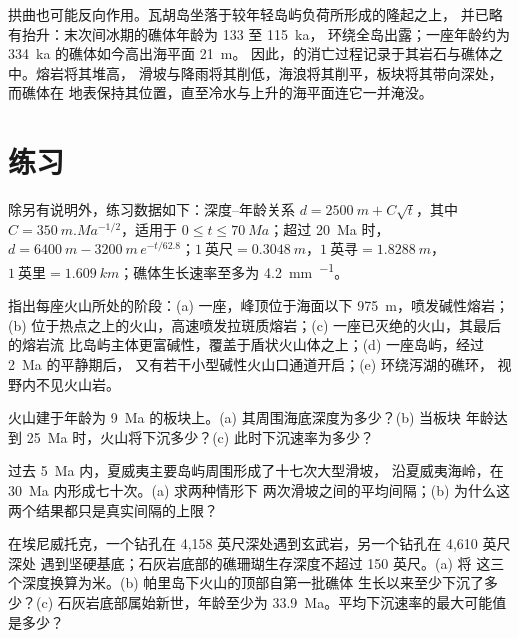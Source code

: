 拱曲也可能反向作用。瓦胡岛坐落于较年轻岛屿负荷所形成的隆起之上，
并已略有抬升：末次间冰期的礁体年龄为 133 至 \qty{115}{ka}，
环绕全岛出露；一座年龄约为 \qty{334}{ka} 的礁体如今高出海平面 \qty{21}{m}。
因此，的消亡过程记录于其岩石与礁体之中。熔岩将其堆高，
滑坡与降雨将其削低，海浪将其削平，板块将其带向深处，而礁体在
地表保持其位置，直至冷水与上升的海平面连它一并淹没。

\section*{练习}\label{sec:b2:oceanic-islands:exercises}

除另有说明外，练习数据如下：深度–年龄关系 $d = \qty{2500}{m} + C\sqrt t$，其中
$C = \qty{350}{m.Ma^{-1/2}}$，适用于 $0 \le t \le \qty{70}{Ma}$；超过 \qty{20}{Ma} 时，$d = \qty{6400}{m} -
\qty{3200}{m}\,e^{-t/62.8}$；$1~\text{英尺} = \qty{0.3048}{m}$，$1~\text{英寻}
= \qty{1.8288}{m}$，$1~\text{英里} = \qty{1.609}{km}$；礁体生长速率至多为 \qty{4.2}{mm.^{-1}}。

\begin{exercise}[$\star$]\label{exo:b2:oceanic-islands:1}
指出每座火山所处的阶段：(a) 一座，峰顶位于海面以下 \qty{975}{m}，喷发碱性熔岩；
(b) 位于热点之上的火山，高速喷发拉斑质熔岩；(c) 一座已灭绝的火山，其最后的熔岩流
比岛屿主体更富碱性，覆盖于盾状火山体之上；(d) 一座岛屿，经过 \qty{2}{Ma} 的平静期后，
又有若干小型碱性火山口通道开启；(e) 环绕泻湖的礁环，
视野内不见火山岩。
\end{exercise}

\begin{exercise}[$\star$]\label{exo:b2:oceanic-islands:2}
火山建于年龄为 \qty{9}{Ma} 的板块上。(a) 其周围海底深度为多少？(b) 当板块
年龄达到 \qty{25}{Ma} 时，火山将下沉多少？(c) 此时下沉速率为多少？
\end{exercise}

\begin{exercise}[$\star$]\label{exo:b2:oceanic-islands:3}
过去 \qty{5}{Ma} 内，夏威夷主要岛屿周围形成了十七次大型滑坡，
沿夏威夷海岭，在 \qty{30}{Ma} 内形成七十次。(a) 求两种情形下
两次滑坡之间的平均间隔；(b) 为什么这两个结果都只是真实间隔的上限？
\end{exercise}

\begin{exercise}[$\star$]\label{exo:b2:oceanic-islands:4}
在埃尼威托克，一个钻孔在 4,158 英尺深处遇到玄武岩，另一个钻孔在 4,610 英尺深处
遇到坚硬基底；石灰岩底部的礁珊瑚生存深度不超过 150 英尺。(a) 将
这三个深度换算为米。(b) 帕里岛下火山的顶部自第一批礁体
生长以来至少下沉了多少？(c) 石灰岩底部属始新世，年龄至少为
\qty{33.9}{Ma}。平均下沉速率的最大可能值是多少？
\end{exercise}

